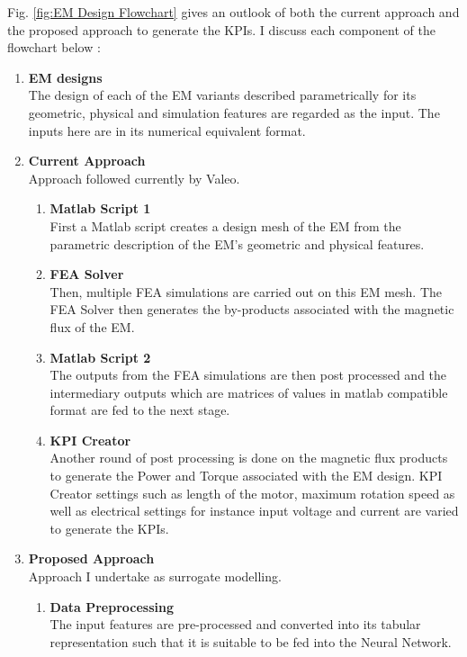 \documentclass{report} %
\begin{document}
Fig. \ref{fig:EM Design Flowchart} gives an outlook of both the current approach and the proposed approach to generate the \ac{KPI}s.
I discuss each component of the flowchart below :
\begin{enumerate}
    \item \textbf{\ac{EM} designs} \\
    The design of each of the \ac{EM} variants described parametrically for its geometric, physical and simulation features are regarded as the input.
    The inputs here are in its numerical equivalent format.
    \item \textbf{Current Approach}\\
    Approach followed currently by Valeo.
    \begin{enumerate}
        \item \textbf{Matlab Script 1} \\
        First a Matlab script creates a design mesh of the \ac{EM} from the parametric description of the \ac{EM}'s geometric and physical features.
        \item \textbf{\ac{FEA} Solver} \\
        Then, multiple \ac{FEA} simulations are carried out on this \ac{EM} mesh. The \ac{FEA} Solver then generates the by-products associated with the magnetic flux 
        of the \ac{EM}.
        \item \textbf{Matlab Script 2} \\
        The outputs from the \ac{FEA} simulations are then post processed and the intermediary outputs which are matrices of values in matlab compatible format are 
        fed to the next stage.
        \item \textbf{KPI Creator} \\
        Another round of post processing is done on the magnetic flux products to generate the Power and Torque associated with the \ac{EM} design.
        KPI Creator settings such as length of the motor, maximum rotation speed as well as electrical settings for instance input voltage and current are varied to 
        generate the \ac{KPI}s. 
    \end{enumerate}
    \item \textbf{Proposed Approach}\\
    Approach I undertake as surrogate modelling.
    \begin{enumerate}
        \item \textbf{Data Preprocessing} \\
        The input features are pre-processed and converted into its tabular representation such that it is suitable to be fed into the Neural Network.

\end{enumerate}
\end{enumerate}
\end{document}
